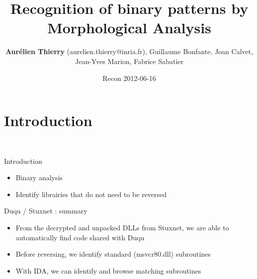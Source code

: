 \documentclass{beamer}
\title[Recognition of binary patterns by Morphological Analysis]{Recognition of binary patterns by Morphological Analysis}
\author{\textbf{Aurélien Thierry} (aurelien.thierry@inria.fr), Guillaume Bonfante, Joan Calvet, Jean-Yves Marion, Fabrice Sabatier}
\date{Recon 2012-06-16}
\begin{document}
\makeatletter
  \gdef\inserttotalframenumber{\inserttotalframenumbernew}
\makeatother

\section{Introduction}
\begin{frame}
\titlepage
\begin{figure}[ht]
\begin{center}
  \quad
  \
\quad
\end{center}
\label{fig:CFGConstrNorm}
\end{figure}
\end{frame}


 \begin{frame}{Introduction}

\begin{itemize}
 \item Binary analysis
 \begin{figure}
\end{figure}
 \item<2-> Identify librairies that do not need to be reversed
\end{itemize}
{}
\end{frame}



\begin{frame}{Duqu / Stuxnet : summary}
\begin{itemize}
 \item From the decrypted and unpacked DLLs from Stuxnet, we are able to automatically find code shared with Duqu
 \item Before reversing, we identify standard (msvcr80.dll) subroutines
 \item With IDA, we can identify and browse matching subroutines
\end{itemize}
\end{frame}
\end{document}
